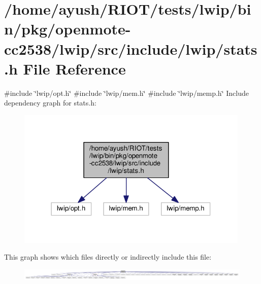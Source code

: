 \hypertarget{openmote-cc2538_2lwip_2src_2include_2lwip_2stats_8h}{}\section{/home/ayush/\+R\+I\+O\+T/tests/lwip/bin/pkg/openmote-\/cc2538/lwip/src/include/lwip/stats.h File Reference}
\label{openmote-cc2538_2lwip_2src_2include_2lwip_2stats_8h}
{\ttfamily \#include \char`\"{}lwip/opt.\+h\char`\"{}}\newline
{\ttfamily \#include \char`\"{}lwip/mem.\+h\char`\"{}}\newline
{\ttfamily \#include \char`\"{}lwip/memp.\+h\char`\"{}}\newline
Include dependency graph for stats.\+h\+:
\nopagebreak
\begin{figure}[H]
\begin{center}
\leavevmode
\includegraphics[width=315pt]{openmote-cc2538_2lwip_2src_2include_2lwip_2stats_8h__incl}
\end{center}
\end{figure}
This graph shows which files directly or indirectly include this file\+:
\nopagebreak
\begin{figure}[H]
\begin{center}
\leavevmode
\includegraphics[width=350pt]{openmote-cc2538_2lwip_2src_2include_2lwip_2stats_8h__dep__incl}
\end{center}
\end{figure}
